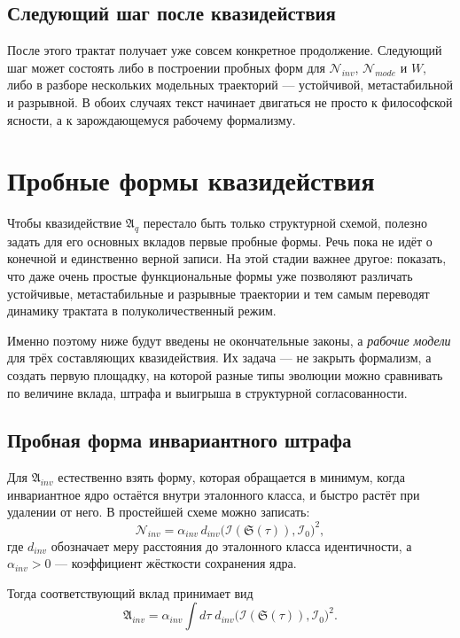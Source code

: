 \documentclass[12pt,a4paper]{article}
\begin{document}
\subsection{Следующий шаг после квазидействия}

После этого трактат получает уже совсем конкретное продолжение. Следующий шаг может состоять либо в построении пробных форм для \(\mathcal{N}_{inv}\), \(\mathcal{N}_{mode}\) и \(W\), либо в разборе нескольких модельных траекторий --- устойчивой, метастабильной и разрывной. В обоих случаях текст начинает двигаться не просто к философской ясности, а к зарождающемуся рабочему формализму.

\section{Пробные формы квазидействия}

Чтобы квазидействие \(\mathfrak{A}_{q}\) перестало быть только структурной схемой, полезно задать для его основных вкладов первые пробные формы. Речь пока не идёт о конечной и единственно верной записи. На этой стадии важнее другое: показать, что даже очень простые функциональные формы уже позволяют различать устойчивые, метастабильные и разрывные траектории и тем самым переводят динамику трактата в полуколичественный режим.

Именно поэтому ниже будут введены не окончательные законы, а \textit{рабочие модели} для трёх составляющих квазидействия. Их задача --- не закрыть формализм, а создать первую площадку, на которой разные типы эволюции можно сравнивать по величине вклада, штрафа и выигрыша в структурной согласованности.

\subsection{Пробная форма инвариантного штрафа}

Для \(\mathfrak{A}_{inv}\) естественно взять форму, которая обращается в минимум, когда инвариантное ядро остаётся внутри эталонного класса, и быстро растёт при удалении от него. В простейшей схеме можно записать:
\begin{equation}
\mathcal{N}_{inv}=\alpha_{inv}\, d_{inv}\bigl(\mathcal{I}(\mathfrak{S}(\tau)),\mathcal{I}_0\bigr)^2,
\end{equation}
где \(d_{inv}\) обозначает меру расстояния до эталонного класса идентичности, а \(\alpha_{inv}>0\) --- коэффициент жёсткости сохранения ядра.

Тогда соответствующий вклад принимает вид
\begin{equation}
\mathfrak{A}_{inv}=\alpha_{inv}\int d\tau\; d_{inv}\bigl(\mathcal{I}(\mathfrak{S}(\tau)),\mathcal{I}_0\bigr)^2.
\end{equation}
\end{document}
